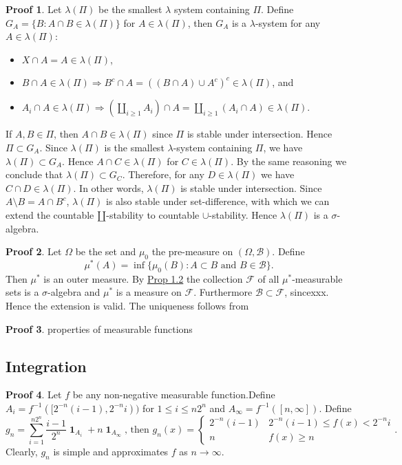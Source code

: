 \documentclass[hidelinks,11pt]{article}
\theoremstyle{definition}
\theoremstyle{dotless}
\newtheorem{prop}{Proof}[section]
\theoremstyle{remark}
\DeclareMathOperator{\1}{\mathbf{1}}
\DeclareMathOperator{\0}{\mathbf{0}}
\begin{document}
\begin{prop}
Let $\lambda(\Pi)$ be the smallest $\lambda$ system containing $\Pi$. Define $G_A=\{B:A\cap B\in\lambda(\Pi)\}$ for $A\in\lambda(\Pi)$, then $G_A$ is a $\lambda$-system for any $A\in\lambda(\Pi)$:\begin{itemize}
    \item $X\cap A=A\in\lambda(\Pi)$,
    \item $B\cap A\in\lambda(\Pi)\Rightarrow B^c\cap A=((B\cap A)\cup A^c)^c\in\lambda(\Pi)$, and
    \item $A_i\cap A\in\lambda(\Pi)\Rightarrow(\amalg_{i\geq1}A_i)\cap A=\amalg_{i\geq1}(A_i\cap A)\in\lambda(\Pi)$.
\end{itemize}
If $A,B\in\Pi$, then $A\cap B\in\lambda(\Pi)$ since $\Pi$ is stable under intersection. Hence $\Pi\subset G_A$. Since $\lambda(\Pi)$ is the smallest $\lambda$-system containing $\Pi$, we have $\lambda(\Pi)\subset G_A$. Hence $A\cap C\in\lambda(\Pi)$ for $C\in\lambda(\Pi)$. By the same reasoning we conclude that $\lambda(\Pi)\subset G_C$. Therefore, for any $D\in\lambda(\Pi)$ we have $C\cap D\in\lambda(\Pi)$. In other words, $\lambda(\Pi)$ is stable under intersection.\medbreak
Since $A\setminus B=A\cap B^c$, $\lambda(\Pi)$ is also stable under set-difference, with which we can extend the countable $\amalg$-stability to countable $\cup$-stability. Hence $\lambda(\Pi)$ is a $\sigma$-algebra.
\end{prop}

\begin{prop}
Let $\Omega$ be the set and $\mu_0$ the pre-measure on $(\Omega,\mathcal{B})$. Define
\[\mu^\ast(A)=\inf\{\mu_0(B):A\subset B\textrm{ and }B\in\mathcal{B}\}.\]
Then $\mu^\ast$ is an outer measure. By \hyperref[Prop 1.2]{Prop 1.2} the collection $\mathcal{F}$ of all $\mu^\ast$-measurable sets is a $\sigma$-algebra and $\mu^\ast$ is a measure on $\mathcal{F}$. Furthermore $\mathcal{B}\subset\mathcal{F}$, sincexxx. Hence the extension is valid.\medbreak
The uniqueness follows from 
\end{prop}

\begin{prop}
properties of measurable functions
\end{prop}

\subsection{Integration}

\begin{prop}
Let $f$ be any non-negative measurable function.Define $A_i=f^{-1}([2^{-n}(i-1),2^{-n}i))$
for $1\leq i\leq n2^n$ and $A_\infty=f^{-1}([n,\infty])$. Define
\[g_n=\sum_{i=1}^{n2^n}\frac{i-1}{2^n}\1_{A_i}+n\1_{A_\infty}\textrm{, then }g_n(x)=\begin{cases}
2^{-n}(i-1)&2^{-n}(i-1)\leq f(x)<2^{-n}i\\
n&f(x)\geq n
\end{cases}.\]
Clearly, $g_n$ is simple and approximates $f$ as $n\to\infty$.
\end{prop}
\end{document}
